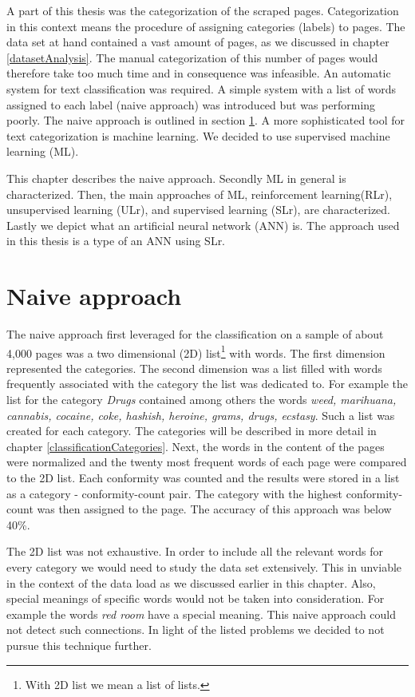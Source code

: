 \label{classification}
A part of this thesis was the categorization of the scraped pages. Categorization in this context means the procedure of assigning categories (labels) to pages. The data set at hand contained a vast amount of pages, as we discussed in chapter \ref{datasetAnalysis}. The manual categorization of this number of pages would therefore take too much time and in consequence was infeasible. An automatic system for text classification was required. A simple system with a list of words assigned to each label (naive approach) was introduced but was performing poorly. The naive approach is outlined in section \ref{naiveApproach}. A more sophisticated tool for text categorization is machine learning. We decided to use supervised machine learning (ML).

This chapter describes the naive approach. Secondly ML in general is characterized. Then, the main approaches of ML, reinforcement learning(RLr), unsupervised learning (ULr), and supervised learning (SLr), are characterized. Lastly we depict what an artificial neural network (ANN) is. The approach used in this thesis is a type of an ANN using SLr.


 \section{Naive approach} \label{naiveApproach}
The naive approach first leveraged for the classification on a sample of about 4,000 pages was a two dimensional (2D) list\footnote{With 2D list we mean a list of lists.} with words. The first dimension represented the categories. The second dimension was a list filled with words frequently associated with the category the list was dedicated to. For example the list for the category \textit{Drugs} contained among others the words \textit{weed, marihuana, cannabis, cocaine, coke, hashish, heroine, grams, drugs, ecstasy}. Such a list was created for each category. The categories will be described in more detail in chapter \ref{classificationCategories}. Next, the words in the content of the pages were normalized and the twenty most frequent words of each page were compared to the 2D list. Each conformity was counted and the results were stored in a list as a category - conformity-count pair. The category with the highest conformity-count was then assigned to the page. The accuracy of this approach was below 40\%.

The 2D list was not exhaustive. In order to include all the relevant words for every category we would need to study the data set extensively. This in unviable in the context of the data load as we discussed earlier in this chapter. Also, special meanings of specific words would not be taken into consideration. For example the words \textit{red room} have a special meaning. This naive approach could not detect such connections. In light of the listed problems we decided to not pursue this technique further.


